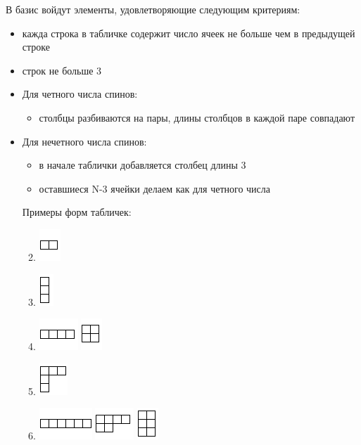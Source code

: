 \documentclass[]{article}
\begin{document}
В базис войдут элементы, удовлетворяющие следующим критериям:
\begin{itemize}
	\item кажда строка в табличке содержит число ячеек не больше чем в предыдущей строке
	\item строк не больше 3
	\item Для четного числа спинов:
	\begin{itemize}
		\item столбцы разбиваются на пары, длины столбцов в каждой паре совпадают
	\end{itemize}
	\item Для нечетного числа спинов:
	\begin{itemize}
		\item в начале таблички добавляется столбец длины 3
		\item оставшиеся N-3 ячейки делаем как для четного числа
	\end{itemize}
	Примеры форм табличек:
	\begin{enumerate}
		\setcounter{enumi}{1}
		\item %
			\includegraphics{1x2.png}

\item %
		\includegraphics{3x1.png}

\item %
		\includegraphics{1x4.png}
		\includegraphics{2x2.png}

\item %
		\includegraphics{3x3.png}

\item %
		\includegraphics{1x6.png}
		\includegraphics{2x4.png}
		\includegraphics{3x2.png}


\end{enumerate}
\end{itemize}
\end{document}
